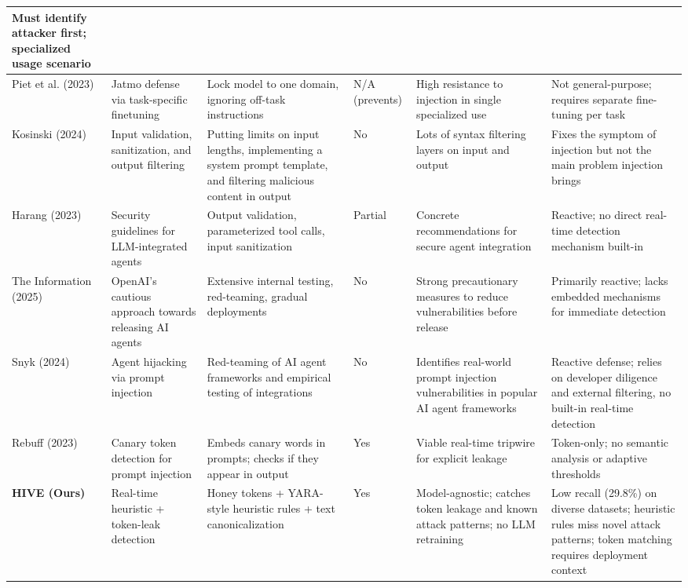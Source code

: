 \documentclass[manuscript,screen,review]{acmart}
\begin{document}
\begin{table}[!htbp]
\begin{tabular}{p{55pt}p{60pt}p{70pt}p{40pt}p{70pt}p{75pt}}
Must identify attacker first; specialized usage scenario \\
\midrule
Piet et al. (2023) ~\cite{b8} &
Jatmo defense via task-specific finetuning &
Lock model to one domain, ignoring off-task instructions &
N/A (prevents) &
High resistance to injection in single specialized use &
Not general-purpose; requires separate fine-tuning per task \\
\midrule
Kosinski (2024) ~\cite{b9} &
Input validation, sanitization, and output filtering &
Putting limits on input lengths, implementing a system prompt template, and filtering malicious content in output &
No &
Lots of syntax filtering layers on input and output &
Fixes the symptom of injection but not the main problem injection brings \\
\midrule
Harang (2023) ~\cite{b10} & 
Security guidelines for LLM-integrated agents & 
Output validation, parameterized tool calls, input sanitization & 
Partial & Concrete recommendations for secure agent integration & 
Reactive; no direct real-time detection mechanism built-in \\
\midrule
The Information (2025) ~\cite{b11} &
OpenAI's cautious approach towards releasing AI agents &
Extensive internal testing, red-teaming, gradual deployments &
No &
Strong precautionary measures to reduce vulnerabilities before release & 
Primarily reactive; lacks embedded mechanisms for immediate detection \\
\midrule
Snyk (2024) ~\cite{b12} & 
Agent hijacking via prompt injection & 
Red-teaming of AI agent frameworks and empirical testing of integrations & 
No & 
Identifies real-world prompt injection vulnerabilities in popular AI agent frameworks & 
Reactive defense; relies on developer diligence and external filtering, no built-in real-time detection \\
\midrule
Rebuff (2023) ~\cite{b13} & 
Canary token detection for prompt injection &
Embeds canary words in prompts; checks if they appear in output &
Yes &
Viable real-time tripwire for explicit leakage &
Token-only; no semantic analysis or adaptive thresholds \\
\midrule
\textbf{HIVE (Ours)} &
Real-time heuristic + token-leak detection &
Honey tokens + YARA-style heuristic rules + text canonicalization &
Yes &
Model-agnostic; catches token leakage and known attack patterns; no LLM retraining &
Low recall (29.8\%) on diverse datasets; heuristic rules miss novel attack patterns; token matching requires deployment context \\
\bottomrule
\end{tabular}
\end{table}
\end{document}
